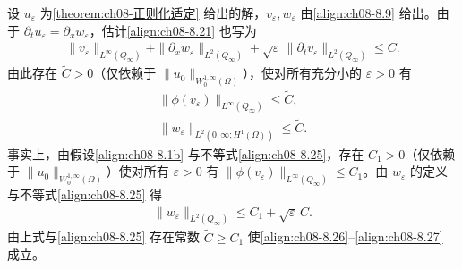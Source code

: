 \documentclass[../../main.tex]{subfiles}%
\begin{document}
\begin{remark}\label{remark:ch08-估计改写}
设 $u_\varepsilon$ 为\cref{theorem:ch08-正则化适定} 给出的解，$v_\varepsilon,w_\varepsilon$ 由\eqref{align:ch08-8.9} 给出。由于 $\partial_t u_\varepsilon=\partial_x w_\varepsilon$，估计\eqref{align:ch08-8.21} 也写为
\begin{align}
\|v_\varepsilon\|_{L^\infty(Q_\infty)}+\|\partial_x w_\varepsilon\|_{L^2(Q_\infty)}
+\sqrt{\varepsilon}\,\|\partial_t v_\varepsilon\|_{L^2(Q_\infty)}\leqslant C. \label{align:ch08-8.25}
\end{align}
由此存在 $\widetilde C>0$（仅依赖于 $\|u_0\|_{W^{1,\infty}_0(\Omega)}$），使对所有充分小的 $\varepsilon>0$ 有
\begin{align}
\|\phi(v_\varepsilon)\|_{L^\infty(Q_\infty)}\leqslant\widetilde C, \label{align:ch08-8.26}\\
\|w_\varepsilon\|_{L^2(0,\infty;H^1(\Omega))}\leqslant\widetilde C. \label{align:ch08-8.27}
\end{align}
事实上，由假设\eqref{align:ch08-8.1b} 与不等式\eqref{align:ch08-8.25}，存在 $C_1>0$（仅依赖于 $\|u_0\|_{W^{1,\infty}_0(\Omega)}$）使对所有 $\varepsilon>0$ 有 $\|\phi(v_\varepsilon)\|_{L^\infty(Q_\infty)}\leqslant C_1$。由 $w_\varepsilon$ 的定义与不等式\eqref{align:ch08-8.25} 得
\begin{align*}
\|w_\varepsilon\|_{L^2(Q_\infty)}\leqslant C_1+\sqrt{\varepsilon}\,C.
\end{align*}
由上式与\eqref{align:ch08-8.25} 存在常数 $\widetilde C\geqslant C_1$ 使\eqref{align:ch08-8.26}--\eqref{align:ch08-8.27} 成立。
\end{remark}
\end{document}
